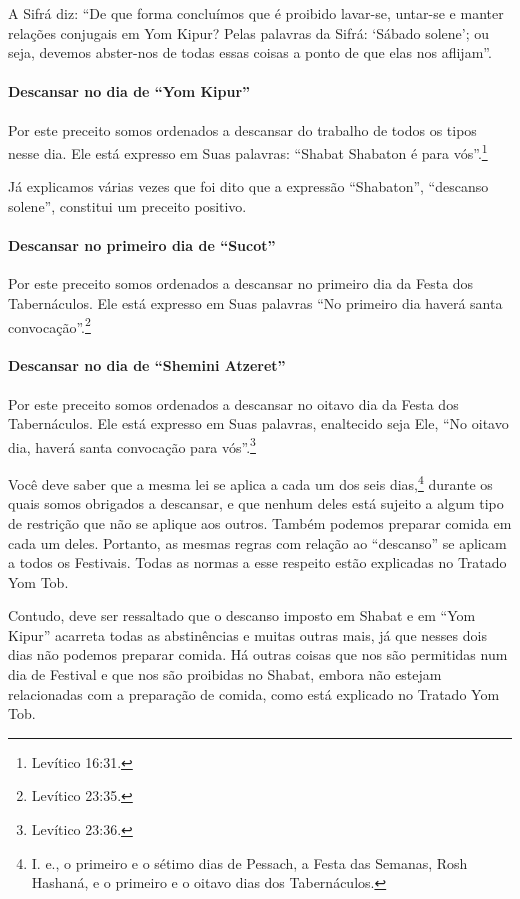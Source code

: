A Sifrá diz: ``De que forma concluímos que é proibido lavar-se, untar-se
e manter relações conjugais em Yom Kipur? Pelas palavras da Sifrá:
`Sábado solene'; ou seja, devemos abster-nos de todas essas coisas a
ponto de que elas nos aflijam''.

\paragraph{Descansar no dia de ``Yom Kipur''}

Por este preceito somos ordenados a descansar do trabalho de todos os
tipos nesse dia. Ele está expresso em Suas palavras: ``Shabat Shabaton é
para vós''.\footnote{Levítico 16:31.}

Já explicamos várias vezes que foi dito que a expressão ``Shabaton'',
``descanso solene'', constitui um preceito positivo.

\paragraph{Descansar no primeiro dia de ``Sucot''}

Por este preceito somos ordenados a descansar no primeiro dia da Festa
dos Tabernáculos. Ele está expresso em Suas palavras ``No primeiro dia
haverá santa convocação''.\footnote{Levítico 23:35.}

\paragraph{Descansar no dia de ``Shemini Atzeret''}

Por este preceito somos ordenados a descansar no oitavo dia da Festa
dos Tabernáculos. Ele está expresso em Suas palavras, enaltecido seja
Ele, ``No oitavo dia, haverá santa convocação para vós''.\footnote{Levítico 23:36.}

Você deve saber que a mesma lei se aplica a cada um dos seis
dias,\footnote{I. e., o primeiro e o sétimo dias de Pessach, a Festa das
Semanas, Rosh Hashaná, e o primeiro e o oitavo dias dos Tabernáculos.} durante os quais somos obrigados a
descansar, e que nenhum deles está sujeito a algum tipo de restrição que não se aplique aos outros. Também podemos preparar comida em cada um deles. Portanto, as mesmas regras com relação ao ``descanso'' se aplicam a todos os Festivais. Todas as normas a esse
respeito estão explicadas no Tratado Yom Tob.

Contudo, deve ser ressaltado que o descanso imposto em Shabat e em ``Yom
Kipur'' acarreta todas as abstinências e muitas outras mais, já que
nesses dois dias não podemos preparar comida. Há outras coisas que nos
são permitidas num dia de Festival e que nos são proibidas no Shabat,
embora não estejam relacionadas com a preparação de comida, como está
explicado no Tratado Yom Tob.

